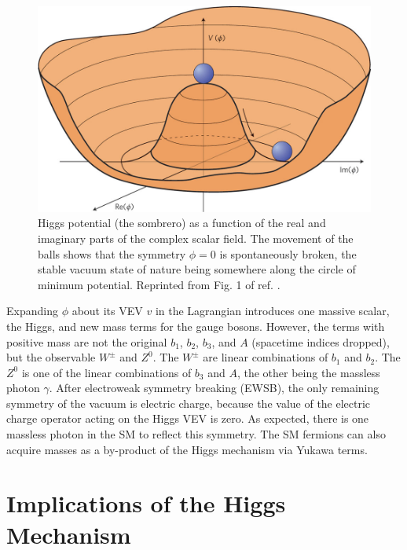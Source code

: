 \documentclass[dissertation.tex]{subfiles}
\begin{document}
\begin{figure}
	\centering
	\includegraphics[scale=0.3]{Higgs_potential}
	\caption{Higgs potential (the sombrero) as a function of the real and imaginary parts of the complex scalar field.  The movement of the balls shows that the symmetry $\phi = 0$ is spontaneously broken, the stable vacuum state of nature being somewhere along the circle of minimum potential.  Reprinted from Fig. 1 of ref. \cite{Alvarez-Gaume}.}
	\label{fig:Higgs_potential}
\end{figure}

Expanding $\phi$ about its VEV $v$ in the Lagrangian introduces one massive scalar, the Higgs, and new mass terms for the gauge bosons.  However, the terms with positive mass are not the original $b_{1}$, $b_{2}$, $b_{3}$, and $A$ (spacetime indices dropped), but the observable $W^{\pm}$ and $Z^{0}$.  The $W^{\pm}$ are linear combinations of $b_{1}$ and $b_{2}$.  The $Z^{0}$ is one of the linear combinations of $b_{3}$ and $A$, the other being the massless photon $\gamma$.  After electroweak symmetry breaking (EWSB), the only remaining symmetry of the vacuum is electric charge, because the value of the electric charge operator acting on the Higgs VEV is zero.  As expected, there is one massless photon in the SM to reflect this symmetry.  The SM fermions can also acquire masses as a by-product of the Higgs mechanism via Yukawa terms.

\section{Implications of the Higgs Mechanism}
\label{sec:Implications of the Higgs Mechanism}
\end{document}
